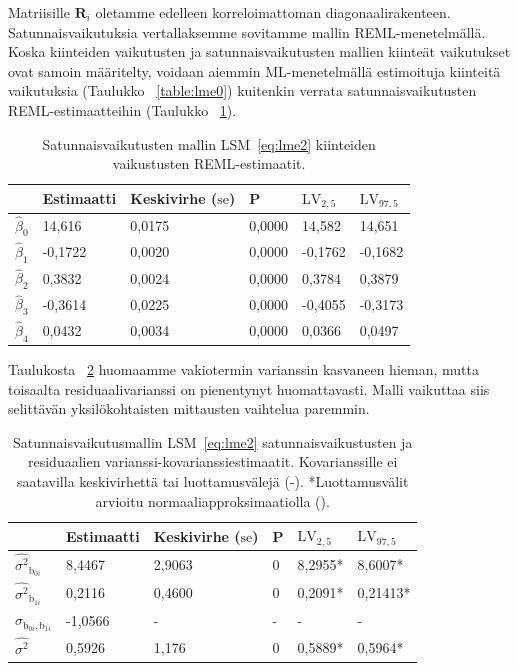 \documentclass[finnish]{docopts}
\begin{document}
Matriisille $\bm{R}_i$ oletamme edelleen korreloimattoman diagonaalirakenteen.\\

Satunnaisvaikutuksia vertallaksemme sovitamme mallin REML-menetelmällä. Koska kiinteiden vaikutusten ja satunnaisvaikutusten mallien kiinteät vaikutukset ovat samoin määritelty, voidaan aiemmin ML-menetelmällä estimoituja kiinteitä vaikutuksia (Taulukko ~\ref{table:lme0}) kuitenkin verrata satunnaisvaikutusten REML-estimaatteihin (Taulukko ~\ref{table:lme2}).

\begin{table}[H]
\centering
\begin{tabular}{llllll}
\toprule
  & Estimaatti & Keskivirhe ($\text{se}$) & P & $\text{LV}_{2,5}$ & $\text{LV}_{97,5}$\\
\midrule
$\hat{\beta}_0$ & 14,616 & 0,0175 & 0,0000 & 14,582 & 14,651\\
$\hat{\beta}_1$ & -0,1722 & 0,0020 & 0,0000 & -0,1762 & -0,1682\\
$\hat{\beta}_2$ & 0,3832 & 0,0024 & 0,0000 & 0,3784 & 0,3879\\
$\hat{\beta}_3$ & -0,3614 & 0,0225 & 0,0000 & -0,4055 & -0,3173\\
$\hat{\beta}_4$ & 0,0432 & 0,0034 & 0,0000 & 0,0366 & 0,0497\\
\bottomrule
\end{tabular}
\caption{Satunnaisvaikutusten mallin LSM~\ref{eq:lme2} kiinteiden vaikustusten REML-estimaatit.}
\label{table:lme2}
\end{table}

Taulukosta ~\ref{table:lme3} huomaamme vakiotermin varianssin kasvaneen hieman, mutta toisaalta residuaalivarianssi on pienentynyt huomattavasti. Malli vaikuttaa siis selittävän yksilökohtaisten mittausten vaihtelua paremmin.\\

\begin{table}[H]
\centering
\begin{tabular}{llllll}
\toprule
  & Estimaatti & Keskivirhe ($\text{se}$) & P & $\text{LV}_{2,5}$ & $\text{LV}_{97,5}$\\
\midrule
$\hat{\sigma^2}_{\text{b}_{0i}}$ & 8,4467 & 2,9063 & 0 & 8,2955* & 8,6007*\\
$\hat{\sigma^2}_{\text{b}_{1i}}$ & 0,2116 & 0,4600 & 0 & 0,2091* & 0,21413*\\
$\hat{\sigma}_{\text{b}_{0i}, \text{b}_{1i}}$ & -1,0566 & - & - & - & -\\
\addlinespace
$\hat{\sigma^2}$ & 0,5926 & 1,176 & 0 & 0,5889* & 0,5964*\\
\bottomrule
\end{tabular}
\caption{Satunnaisvaikutusmallin LSM~\ref{eq:lme2} satunnaisvaikustusten ja residuaalien varianssi-kovarianssiestimaatit. Kovarianssille ei saatavilla keskivirhettä tai luottamusvälejä (-). *Luottamusvälit arvioitu normaaliapproksimaatiolla (\cite{pinheiro00}).}
\label{table:lme3}
\end{table}
\end{document}
